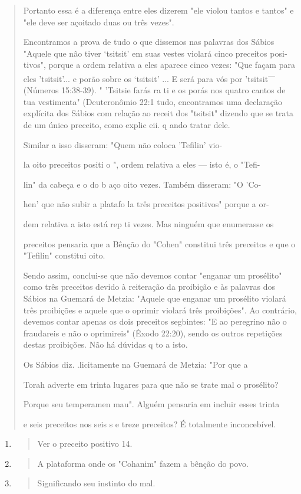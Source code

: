 \begin{quote}
Portanto essa é a diferença entre eles dizerem "ele violou tantos e
tantos" e "ele deve ser açoitado duas ou três vezes".

Encontramos a prova de tudo o que dissemos nas palavras dos Sá­bios
"Aquele que não tiver `tsitsit' em suas vestes violará cinco preceitos
posi­tivos", porque a ordem relativa a eles aparece cinco vezes: "Que
façam para eles 'tsitsit'... e porão sobre os `tsitsit' ... E será para
vós por 'tsitsit\textsuperscript{---} (Números 15:38-39). " 'Tsitsie
farás ra ti e os porás nos quatro cantos de tua vestimen­ta"
(Deuteronômio 22:1 tudo, encontramos uma declaração explícita dos Sábios
com relação ao receit dos "tsitsit" dizendo que se trata de um único
preceito, como explic eii. q ando tratar dele.

Similar a isso disseram: "Quem não coloca 'Tefilin' vio-

la oito preceitos positi o ", ordem relativa a eles --- isto é, o "Tefi-

lin" da cabeça e o do b aço oito vezes. Também disseram: "O 'Co-

hen' que não subir a platafo la três preceitos positivos" porque a or-

dem relativa a isto está rep ti vezes. Mas ninguém que enumerasse os

preceitos pensaria que a Bênção do "Cohen" constitui três preceitos e
que o "Tefilin" constitui oito.

Sendo assim, conclui-se que não devemos contar "enganar um pro­sélito"
como três preceitos devido à reiteração da proibição e às palavras dos
Sábios na Guemará de Metzia: "Aquele que enganar um prosélito violará
três proibições e aquele que o oprimir violará três proibições". Ao
contrário, deve­mos contar apenas os dois preceitos segbintes: "E ao
peregrino não o frauda­reis e não o oprimireis" (Êxodo 22:20), sendo os
outros repetições destas proi­bições. Não há dúvidas q to a isto.

Os Sábios diz. .licitamente na Guemará de Metzia: "Por
que a

Torah adverte em trinta lugares para que não se trate mal o prosélito?

Porque seu temperamen mau". Alguém pensaria em incluir esses trinta

e seis preceitos nos seis s e treze preceitos? É totalmente
inconcebível.
\end{quote}

\begin{enumerate}
\def\labelenumi{\arabic{enumi}.}
\setcounter{enumi}{12}
\item
 \begin{quote}
 Ver o preceito positivo 14.
 \end{quote}
\item
 \begin{quote}
 A plataforma onde os "Cohanim" fazem a bênção do povo.
 \end{quote}
\item
 \begin{quote}
 Significando seu instinto do mal.
 \end{quote}
\end{enumerate}

